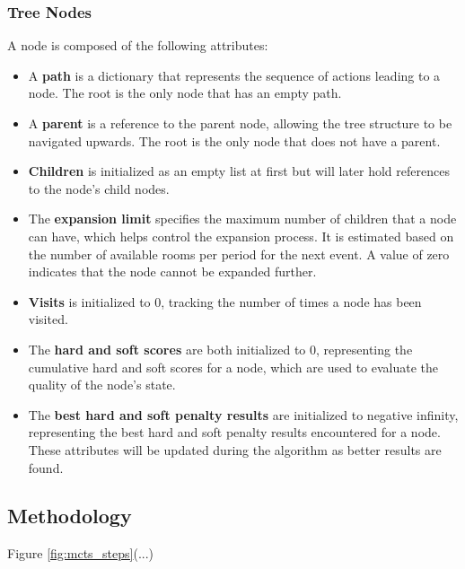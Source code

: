 
\subsubsection{Tree Nodes}

A node is composed of the following attributes:

\begin{itemize}
\item A \textbf{path} is a dictionary that represents the sequence of actions leading to a node. The root is the only node that has an empty path.

\item A \textbf{parent} is a reference to the parent node, allowing the tree structure to be navigated upwards. The root is the only node that does not have a parent.

\item \textbf{Children} is initialized as an empty list at first but will later hold references to the node's child nodes. 

\item The \textbf{expansion limit} specifies the maximum number of children that a node can have, which helps control the expansion process. It is estimated based on the number of available rooms per period for the next event. A value of zero indicates that the node cannot be expanded further.

\item \textbf{Visits} is initialized to 0, tracking the number of times a node has been visited.

\item The \textbf{hard and soft scores} are both initialized to 0, representing the cumulative hard and soft scores for a node, which are used to evaluate the quality of the node's state.

\item The \textbf{best hard and soft penalty results} are initialized to negative infinity, representing the best hard and soft penalty results encountered for a node. These attributes will be updated during the algorithm as better results are found. 
\end{itemize}

\subsection{Methodology}

Figure \ref{fig:mcts_steps}(...)

